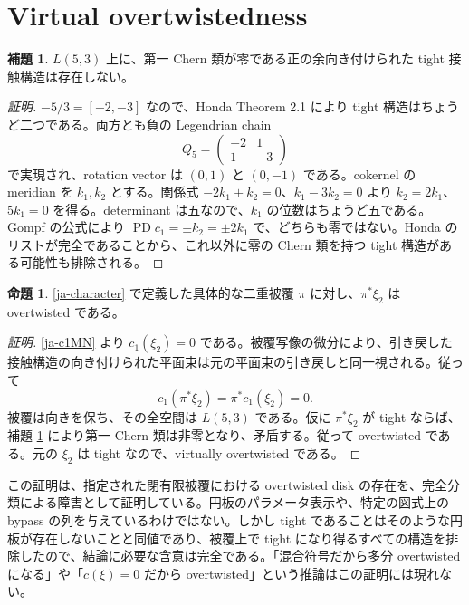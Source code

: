 \documentclass[12pt]{amsart}
\theoremstyle{definition}
\theoremstyle{remark}
\numberwithin{equation}{section}
\theoremstyle{definition}
\newtheorem{jlem}[thm]{補題}
\newtheorem{jprop}[thm]{命題}
\begin{document}
\section{Virtual overtwistedness}\label{ja-vot}
\begin{jlem}\label{ja-upstairs}
$L(5,3)$ 上に、第一 Chern 類が零である正の余向き付けられた tight 接触構造は存在しない。
\end{jlem}
\begin{proof}[証明]
$-5/3=[-2,-3]$ なので、Honda Theorem 2.1 により tight 構造はちょうど二つである。両方とも負の Legendrian chain
\[
Q_5=\begin{pmatrix}-2&1\\1&-3\end{pmatrix}
\]
で実現され、rotation vector は $(0,1)$ と $(0,-1)$ である。cokernel の meridian を $k_1,k_2$ とする。関係式 $-2k_1+k_2=0$、$k_1-3k_2=0$ より $k_2=2k_1$、$5k_1=0$ を得る。determinant は五なので、$k_1$ の位数はちょうど五である。Gompf の公式により $\operatorname{PD}c_1=\pm k_2=\pm2k_1$ で、どちらも零ではない。Honda のリストが完全であることから、これ以外に零の Chern 類を持つ tight 構造がある可能性も排除される。
\end{proof}

\begin{jprop}\label{ja-doubleOT}
\eqref{ja-character} で定義した具体的な二重被覆 $\pi$ に対し、$\pi^*\xi_2$ は overtwisted である。
\end{jprop}
\begin{proof}[証明]
\eqref{ja-c1MN} より $c_1(\xi_2)=0$ である。被覆写像の微分により、引き戻した接触構造の向き付けられた平面束は元の平面束の引き戻しと同一視される。従って
\[
c_1(\pi^*\xi_2)=\pi^*c_1(\xi_2)=0.
\]
被覆は向きを保ち、その全空間は $L(5,3)$ である。仮に $\pi^*\xi_2$ が tight ならば、補題 \ref{ja-upstairs} により第一 Chern 類は非零となり、矛盾する。従って overtwisted である。元の $\xi_2$ は tight なので、virtually overtwisted である。
\end{proof}

この証明は、指定された閉有限被覆における overtwisted disk の存在を、完全分類による障害として証明している。円板のパラメータ表示や、特定の図式上の bypass の列を与えているわけではない。しかし tight であることはそのような円板が存在しないことと同値であり、被覆上で tight になり得るすべての構造を排除したので、結論に必要な含意は完全である。「混合符号だから多分 overtwisted になる」や「$c(\xi)=0$ だから overtwisted」という推論はこの証明には現れない。
\end{document}
